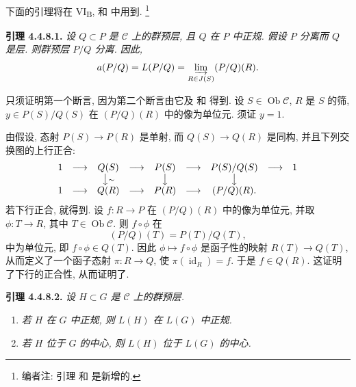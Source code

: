 
\setcounter{footnote}{37}

下面的引理将在 VI\textsubscript{B}, 
和  中用到.
\footnote{编者注: 引理 
和  是新增的.}

\medskip
\noindent{}\textbf{引理 4.4.8.1.}
\textit{设 \(Q\subset P\) 是 \(\mathscr C\) 上的群预层,
且 \(Q\) 在 \(P\) 中正规. 假设 \(P\) 分离而 \(Q\) 是层.
则群预层 \(P/Q\) 分离. 因此,}
\[
  a(P/Q)=L(P/Q)
  =\varinjlim_{R\in J(S)}(P/Q)(R).
\]

只须证明第一个断言, 因为第二个断言由它及
 和
 得到.
设 \(S\in\operatorname{Ob}\mathscr C\), \(R\) 是 \(S\) 的筛,
\(y\in P(S)/Q(S)\) 在 \((P/Q)(R)\) 中的像为单位元.
须证 \(y=1\).

由假设, 态射 \(P(S)\to P(R)\) 是单射,
而 \(Q(S)\to Q(R)\) 是同构, 并且下列交换图的上行正合:
\[
\begin{array}{ccccccccc}
1&\longrightarrow&Q(S)&\longrightarrow&P(S)&\longrightarrow&P(S)/Q(S)
  &\longrightarrow&1\\
&&\big\downarrow{\scriptstyle\sim}&&\big\downarrow&&\big\downarrow\\
1&\longrightarrow&Q(R)&\longrightarrow&P(R)&\longrightarrow&(P/Q)(R).&&
\end{array}
\]
若下行正合, 就得到.
设 \(f:R\to P\) 在 \((P/Q)(R)\) 中的像为单位元,
并取 \(\phi:T\to R\), 其中 \(T\in\operatorname{Ob}\mathscr C\).
则 \(f\circ\phi\) 在
\[
  (P/Q)(T)=P(T)/Q(T),
\]
中为单位元, 即 \(f\circ\phi\in Q(T)\).
因此 \(\phi\mapsto f\circ\phi\) 是函子性的映射 \(R(T)\to Q(T)\),
从而定义了一个函子态射 \(\pi:R\to Q\),
使 \(\pi(\operatorname{id}_R)=f\). 于是 \(f\in Q(R)\).
这证明了下行的正合性, 从而证明了.

\medskip
\noindent{}\textbf{引理 4.4.8.2.}
\textit{设 \(H\subset G\) 是 \(\mathscr C\) 上的群预层.}
\begin{enumerate}
  \item[(i)]
    \textit{若 \(H\) 在 \(G\) 中正规, 则 \(L(H)\) 在 \(L(G)\) 中正规.}
  \item[(ii)]
    \textit{若 \(H\) 位于 \(G\) 的中心, 则 \(L(H)\) 位于 \(L(G)\) 的中心.}
\end{enumerate}

